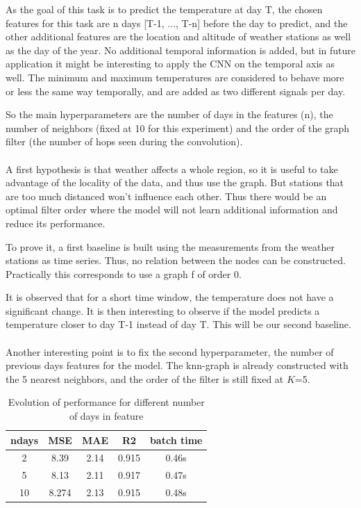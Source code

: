 \documentclass[11pt]{report}
\begin{document}
As the goal of this task is to predict the temperature at day T, the chosen features for this task are n days [T-1, ..., T-n] before the day to predict, and the other additional features are the location and altitude of weather stations as well as the day of the year.
No additional temporal information is added, but in future application it might be interesting to apply the CNN on the temporal axis as well. The minimum and maximum temperatures are considered to behave more or less the same way temporally, and are added as two different signals per day.

So the main hyperparameters are the number of days in the features (n), the number of neighbors (fixed at 10 for this experiment) and the order of the graph filter (the number of hops seen during the convolution).

\paragraph*{}
A first hypothesis is that weather affects a whole region, so it is useful to take advantage of the locality of the data, and thus use the graph. But stations that are too much distanced won't influence each other. Thus there would be an optimal filter order where the model will not learn additional information and reduce its performance.

To prove it, a first baseline is built using the measurements from the weather stations as time series. Thus, no relation between the nodes can be constructed. Practically this corresponds to use a graph f of order 0.

It is observed that for a short time window, the temperature does not have a significant change. It is then interesting to observe if the model predicts a temperature closer to day T-1 instead of day T. This will be our second baseline.

\paragraph*{}
Another interesting point is to fix the second hyperparameter, the number of previous days features for the model. The knn-graph is already constructed with the 5 nearest neighbors, and the order of the filter is still fixed at $K$=5.

\begin{table}[!ht]
    \centering
    \begin{tabular}{c|cccc}
        ndays & MSE & MAE & R2 & batch time \\ \hline 
        2 & 8.39 & 2.14 & 0.915 & 0.46s\\
        5 & 8.13 & 2.11 & 0.917 & 0.47s\\
        10 & 8.274 & 2.13 & 0.915 & 0.48s\\
    \end{tabular}
    \caption{Evolution of performance for different number of days in feature}
    \label{tab:ndays_future}
\end{table}
\end{document}
